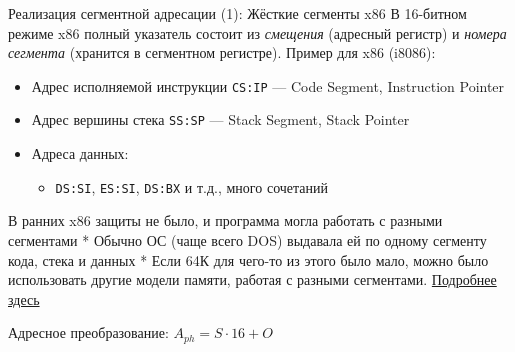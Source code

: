 \documentclass[xetex,aspectratio=43]{beamer}
\begin{document}
\begin{frame}[fragile]{Реализация сегментной адресации (1): Жёсткие сегменты x86}
    В 16-битном режиме x86 полный указатель состоит из \emph{смещения}
    (адресный регистр) и \emph{номера сегмента} (хранится в сегментном
    регистре). Пример для x86 (i8086):

    \begin{itemize}
        \tightlist
        \item
        Адрес исполняемой инструкции \texttt{CS:IP} --- Code Segment,
        Instruction Pointer
        \item
        Адрес вершины стека \texttt{SS:SP} --- Stack Segment, Stack Pointer
        \item
        Адреса данных:

        \begin{itemize}
            \tightlist
            \item
            \texttt{DS:SI}, \texttt{ES:SI}, \texttt{DS:BX} и т.д., много
            сочетаний
        \end{itemize}
    \end{itemize}

    В ранних x86 защиты не было, и программа могла работать с разными
    сегментами * Обычно ОС (чаще всего DOS) выдавала ей по одному сегменту
    кода, стека и данных * Если 64К для чего-то из этого было мало, можно
    было использовать другие модели памяти, работая с разными сегментами.
    \href{http://www.c-jump.com/CIS77/ASM/Directives/D77_0030_models.htm}{Подробнее
        здесь}

    Адресное преобразование: \(A_{ph} = S \cdot 16 + O\)
\end{frame}
\end{document}
